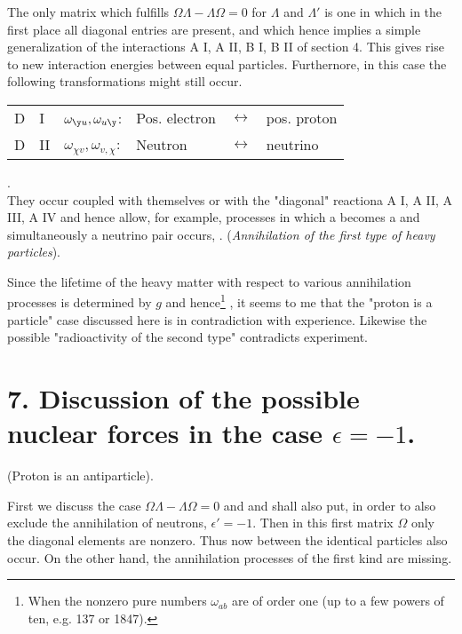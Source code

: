 \documentclass{article}
\begin{document}
The only matrix which fulfills $\Omega\Lambda - \Lambda\Omega = 0$ for $\Lambda$ and $\Lambda'$ is one in which in the first place all diagonal entries are present, and which hence implies a simple generalization of the interactions A I, A II, B I, B II of section 4. This gives rise to new interaction energies between equal particles. Furthernore, in this case the following transformations might still occur.\\
\begin{tabular}{llllll}
D & I & $\omega_{\y u},\omega_{u\y}$: & Pos. electron & $\leftrightarrow$ & pos. proton \\
D & II & $\omega_{\chi v}, \omega_{v, \chi}$: & Neutron & $\leftrightarrow$ & neutrino \\
\end{tabular}.\\
They occur coupled with themselves or with the "diagonal" reactiona A I, A II, A III, A IV and hence allow, for example, processes in which a  becomes a  and simultaneously a neutrino pair occurs, . (\textit{Annihilation of the first type of heavy particles}). 

Since the lifetime of the heavy matter with respect to various annihilation processes is determined by $g$ and hence\footnote{When the nonzero pure numbers $\omega_{ab}$ are of order one (up to a few powers of ten, e.g. 137 or 1847).} , it seems to me that the "proton is a particle" case discussed here is in contradiction with experience. Likewise the possible "radioactivity of the second type" contradicts experiment.

\section*{7. Discussion of the possible nuclear forces in the case $\epsilon=-1$.} (Proton is an antiparticle).

First we discuss the case $\Omega\Lambda - \Lambda\Omega = 0$ and and shall also put, in order to also exclude the annihilation of neutrons, $\epsilon' = -1$. Then in this first matrix $\Omega$ only the diagonal elements are nonzero. Thus now  between the identical particles also occur. On the other hand, the annihilation processes of the first kind are missing.
\end{document}
